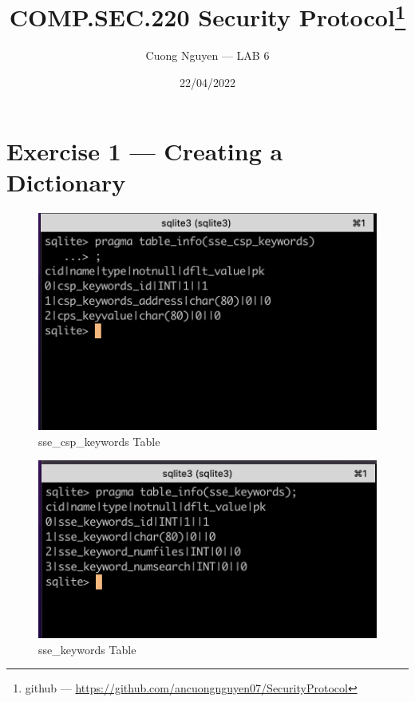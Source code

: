 \documentclass{article}
\title{COMP.SEC.220 Security Protocol\footnote{github --- \url{https://github.com/ancuongnguyen07/SecurityProtocol}}}
\author{Cuong Nguyen --- LAB 6}
\date{22/04/2022}
\begin{document}
    
\maketitle

\section*{Exercise 1 --- Creating a Dictionary}

\begin{figure}
    \centering
    \includegraphics[height=\textheight,width=\textwidth,
    keepaspectratio]{sse_csp_keywords_table.png}
    \caption{sse_csp_keywords Table}
    \label{fig:sse_csp_keywords}
\end{figure}

\begin{figure}
    \centering
    \includegraphics[height=\textheight,width=\textwidth,
    keepaspectratio]{sse_keywords_table.png}
    \caption{sse_keywords Table}
    \label{fig:sse_keywords}
\end{figure}
\end{document}
